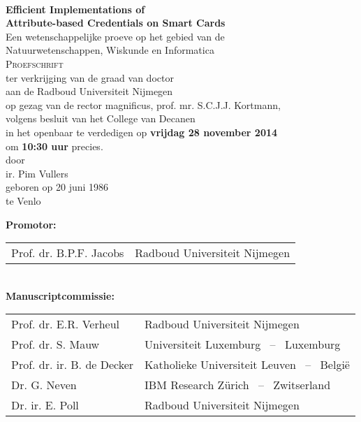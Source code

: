 \thispagestyle{empty}

\begin{center}
  ~ \\[20mm]

  \textbf{\Large Efficient Implementations of\\ Attribute-based Credentials on Smart Cards}\\[15mm]

  Een wetenschappelijke proeve op het gebied van de \\
  Natuurwetenschappen, Wiskunde en Informatica \\[15mm]

  \textsc{Proefschrift} \\[15mm]

  ter verkrijging van de graad van doctor \\
  aan de Radboud Universiteit Nijmegen \\
  op gezag van de rector magnificus, prof. mr. S.C.J.J. Kortmann, \\
  volgens besluit van het College van Decanen \\
  in het openbaar te verdedigen op \textbf{vrijdag 28 november 2014} \\
  om \textbf{10:30 uur} precies. \\[20mm]

  door \\[20mm]

  ir. Pim Vullers \\[15mm]

  geboren op 20 juni 1986 \\
  te Venlo
\end{center}

\clearpage

\thispagestyle{empty}

\noindent\textbf{Promotor:} \\[2mm]
\indent\begin{tabular}{p{40	mm}l}
  Prof. dr. B.P.F. Jacobs & Radboud Universiteit Nijmegen \\
\end{tabular} \\[2mm]

\noindent\textbf{Manuscriptcommissie:} \\[2mm]
\indent\begin{tabular}{p{40mm}l}
  Prof. dr. E.R. Verheul     & Radboud Universiteit Nijmegen \\
  Prof. dr. S. Mauw          & Universiteit Luxemburg ~--~ Luxemburg \\
  Prof. dr. ir. B. de Decker & Katholieke Universiteit Leuven ~--~ Belgi\"{e} \\
  Dr. G. Neven               & IBM Research Z\"{u}rich ~--~ Zwitserland \\
  Dr. ir. E. Poll            & Radboud Universiteit Nijmegen \\
\end{tabular}

